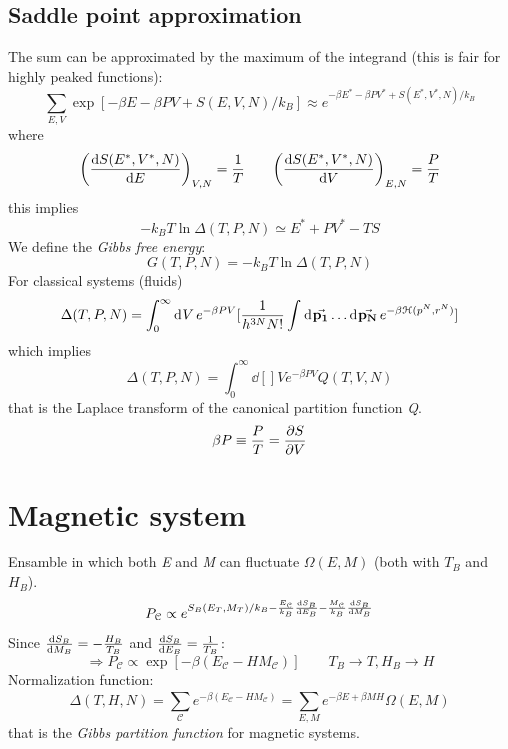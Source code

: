 \documentclass[../main/main.tex]{subfiles}
\begin{document}
\subsection{Saddle point approximation}
The sum can be approximated by the maximum of the integrand (this is fair for highly peaked functions):
\begin{equation}
  \sum_{E,V}^{} \exp [-\beta E- \beta PV + S(E,V,N)/k_B] \approx e^{-\beta E^* - \beta PV^* + S(E^*,V^*,N)/k_B}
\end{equation}
where
\begin{equation}
  \qty(\dv{S(E^*,V^*,N)}{E} )_{V,N} = \frac{1}{T} \qquad \qty(\dv{S(E^*,V^*,N)}{V} )_{E,N} = \frac{P}{T}
\end{equation}
this implies
\begin{equation}
  -k_B T \ln{\Delta (T,P,N)} \simeq E^* + PV^* - TS
\end{equation}
We define the \emph{Gibbs free energy}:
\begin{equation}
  G(T,P,N) = - k_B T \ln{\Delta (T,P,N)}
\end{equation}
For classical systems (fluids)
\begin{equation}
  \Delta (T,P,N) = \int_{0}^{\infty } \dd[]{V} e^{-\beta PV} [ \frac{1}{h^{3N}N!} \int_{}^{} \dd[]{\va{p_1}} \dots \dd[]{\va{p_N}} e^{-\beta \mathcal{H}(p^N,r^N)} ]
\end{equation}
which implies
\begin{equation}
  \Delta (T,P,N) = \int_{0}^{\infty } \dd[]{V} e^{-\beta PV} Q(T,V,N)
\end{equation}
that is the Laplace transform of the canonical partition function \emph{Q}.
\begin{equation}
  \beta P \equiv \frac{P}{T} = \pdv{S}{V}
\end{equation}
\section{Magnetic system}
Ensamble in which both \emph{E} and \emph{M} can fluctuate \( \Omega (E,M) \) (both with \( T_B \) and \( H_B \)).
\begin{equation}
  P_{\mathcal{C}} \propto e^{S_B (E_T,M_T)/k_B - \frac{E_{\mathcal{C}}}{k_B}\dv{S_B}{E_B} - \frac{M_{\mathcal{C}}}{k_B} \dv{S_B}{M_B}  }
\end{equation}
Since \( \dv{S_B}{M_B} = -\frac{H_B}{T_B}   \) and \( \dv{S_B}{E_B} = \frac{1}{T_B}  \):
\begin{equation}
  \Rightarrow P_{\mathcal{C}} \propto \exp [-\beta (E_{\mathcal{C}}-H M_{\mathcal{C}})] \qquad T_B \rightarrow T, H_B \rightarrow H
\end{equation}
Normalization function:
\begin{equation}
  \Delta (T,H,N) = \sum_{\mathcal{C}}^{} e^{-\beta (E_{\mathcal{C}}-H M_{\mathcal{C}})} = \sum_{E,M}^{} e^{-\beta E + \beta M H} \Omega (E,M)
\end{equation}
that is the \emph{Gibbs partition function} for magnetic systems.
\end{document}
